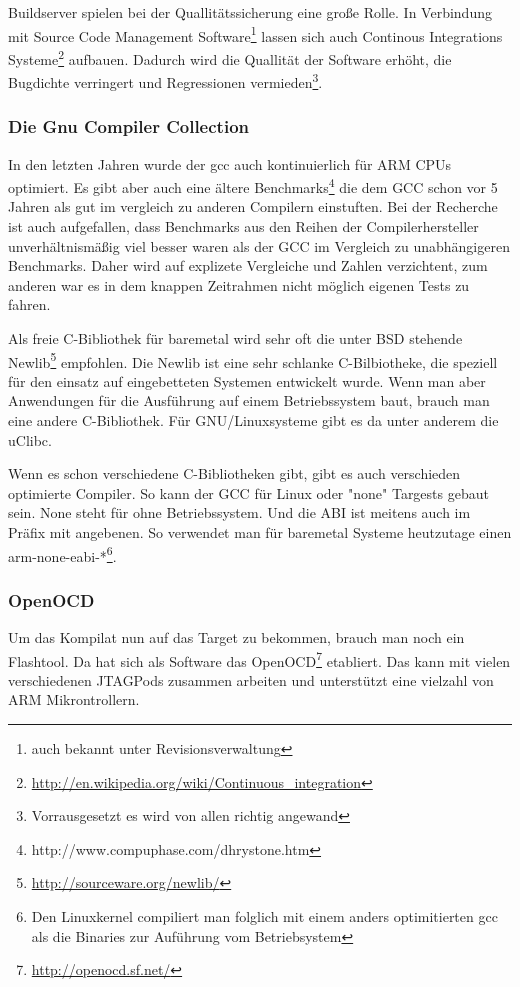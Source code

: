Buildserver spielen bei der Quallitätssicherung eine große Rolle. In Verbindung mit Source Code Management Software\footnote{auch bekannt unter Revisionsverwaltung} lassen sich auch Continous Integrations Systeme\footnote{\url{http://en.wikipedia.org/wiki/Continuous_integration}} aufbauen. Dadurch wird die Quallität der Software erhöht, die Bugdichte verringert und Regressionen vermieden\footnote{Vorrausgesetzt es wird von allen richtig angewand}.

\subsubsection{Die Gnu Compiler Collection}

In den letzten Jahren wurde der \gls{gcc} auch kontinuierlich für ARM CPUs optimiert. Es gibt aber auch eine ältere Benchmarks\footnote{http://www.compuphase.com/dhrystone.htm} die dem GCC schon vor 5 Jahren als gut im vergleich zu anderen Compilern einstuften. Bei der Recherche ist auch aufgefallen, dass Benchmarks aus den Reihen der Compilerhersteller unverhältnismäßig viel besser waren als der GCC im Vergleich zu unabhängigeren Benchmarks. Daher wird auf explizete Vergleiche und Zahlen verzichtent, zum anderen war es in dem knappen Zeitrahmen nicht möglich eigenen Tests zu fahren.


Als freie C-Bibliothek für \gls{baremetal} wird sehr oft die unter BSD stehende Newlib\footnote{\url{http://sourceware.org/newlib/}} empfohlen. Die Newlib ist eine sehr schlanke C-Bilbiotheke, die speziell für den einsatz auf eingebetteten Systemen entwickelt wurde. Wenn man aber Anwendungen für die Ausführung auf einem Betriebssystem baut, brauch man eine andere C-Bibliothek. Für GNU/Linuxsysteme gibt es da unter anderem die uClibc.


Wenn es schon verschiedene C-Bibliotheken gibt, gibt es auch verschieden optimierte Compiler. So kann der GCC für Linux oder "none" Targests gebaut sein. None steht für ohne Betriebssystem. Und die ABI ist meitens auch im Präfix mit angebenen. So verwendet man für baremetal Systeme heutzutage einen arm-none-eabi-*\footnote{Den Linuxkernel compiliert man folglich mit einem anders optimitierten gcc als die Binaries zur Auführung vom Betriebsystem}.

\subsubsection{OpenOCD}

Um das Kompilat nun auf das Target zu bekommen, brauch man noch ein Flashtool. Da hat sich als Software das OpenOCD\footnote{\url{http://openocd.sf.net/}} etabliert. Das kann mit vielen verschiedenen JTAGPods zusammen arbeiten und unterstützt eine vielzahl von ARM Mikrontrollern.

